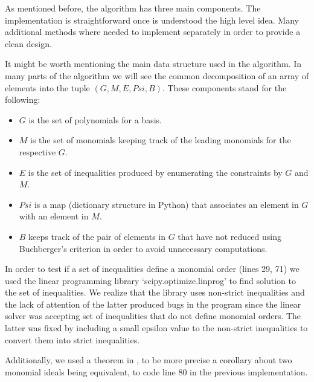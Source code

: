 As mentioned before, the algorithm has three main components. The implementation
is straightforward once is understood the high level idea. Many additional methods
where needed to implement separately in order to provide a clean design.

It might be worth mentioning the main data structure used in the algorithm. In
many parts of the algorithm we will see the common decomposition of an array of
elements into the tuple $(G, M, E, Psi, B)$. These components stand for the following:

\begin{itemize}
\item $G$ is the set of polynomials for a \grob basis.
\item $M$ is the set of monomials keeping track of the leading monomials
  for the respective $G$.
\item $E$ is the set of inequalities produced by enumerating the constraints
  by $G$ and $M$.
\item $Psi$ is a map (dictionary structure in Python) that associates an element
  in $G$ with an element in $M$.
\item $B$ keeps track of the pair of elements in $G$ that have not reduced
  using Buchberger's criterion in order to avoid unnecessary computations.
\end{itemize}

In order to test if a set of inequalities define a monomial order (lines 29, 71)
we used the linear programming library `scipy.optimize.linprog' to find solution
to the set of inequalities. We realize that the library uses non-strict inequalities
and the lack of attention of the latter produced bugs in the program since the
linear solver was accepting set of inequalities that do not define monomial orders.
The latter was fixed by including a small epsilon value to the non-strict inequalities
to convert them into strict inequalities. 

Additionally, we used a theorem in \cite{Cox:2015:IVA:2821082}, to be more precise a
corollary about two monomial ideals being equivalent, to code line 80 in the previous
implementation.

